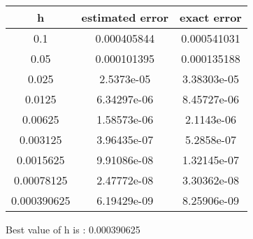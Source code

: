 \documentclass[a4paper]{report}
\begin{document}
\begin{table}[H]
\begin{tabular}{|c|c|c|}
\hline
h & estimated error & exact error \\
\hline
0.1 & 0.000405844 & 0.000541031 \\
0.05 & 0.000101395 & 0.000135188 \\
0.025 & 2.5373e-05 & 3.38303e-05 \\
0.0125 & 6.34297e-06 & 8.45727e-06 \\
0.00625 & 1.58573e-06 & 2.1143e-06 \\
0.003125 & 3.96435e-07 & 5.2858e-07 \\
0.0015625 & 9.91086e-08 & 1.32145e-07 \\
0.00078125 & 2.47772e-08 & 3.30362e-08 \\
0.000390625 & 6.19429e-09 & 8.25906e-09 \\
\hline
\end{tabular}
\end{table}

     Best value of h is : 0.000390625


    \begin{center}
    \end{center}
    { \hspace*{\fill} \\}
    

    
    
    
    
\end{document}
